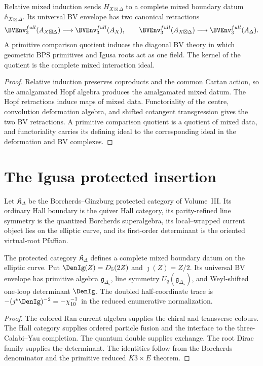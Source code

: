 \begin{theorem}
Relative mixed induction sends $H_{X\boxtimes\Delta}$ to a complete mixed boundary datum $\mathbb A_{X\boxtimes\Delta}$.  Its universal BV envelope has two canonical retractions
\[
 \BVEnv_3^{\mathrm{full}}(\mathbb A_{X\boxtimes\Delta})
 \longrightarrow
 \BVEnv_3^{\mathrm{full}}(\mathbb A_X),
 \qquad
 \BVEnv_3^{\mathrm{full}}(\mathbb A_{X\boxtimes\Delta})
 \longrightarrow
 \BVEnv_3^{\mathrm{full}}(\mathbb A_\Delta).
\]
A primitive comparison quotient induces the diagonal BV theory in which geometric BPS primitives and Igusa roots act as one field.  The kernel of the quotient is the complete mixed interaction ideal.
\end{theorem}
\begin{proof}
Relative induction preserves coproducts and the common Cartan action, so the amalgamated Hopf algebra produces the amalgamated mixed datum.  The Hopf retractions induce maps of mixed data.  Functoriality of the centre, convolution deformation algebra, and shifted cotangent transgression gives the two BV retractions.  A primitive comparison quotient is a quotient of mixed data, and functoriality carries its defining ideal to the corresponding ideal in the deformation and BV complexes.
\end{proof}

\chapter{The Igusa protected insertion}
Let $\mathfrak K_\Delta$ be the Borcherds--Ginzburg protected category of Volume~III.  Its ordinary Hall boundary is the quiver Hall category, its parity-refined line symmetry is the quantized Borcherds superalgebra, its local--wrapped current object lies on the elliptic curve, and its first-order determinant is the oriented virtual-root Pfaffian.

\begin{theorem}
The protected category $\mathfrak K_\Delta$ defines a complete mixed boundary datum on the elliptic curve.  Put $\DenIg(Z)=D_5(2Z)$ and $\jmath(Z)=Z/2$.  Its universal BV envelope has primitive algebra $\mathfrak g_{\Delta_5}$, line symmetry $U_q(\mathfrak g_{\Delta_5})$, and Weyl-shifted one-loop determinant $\DenIg$.  The doubled half-coordinate trace is $-(\jmath^*\DenIg)^{-2}=-\chi_{10}^{-1}$ in the reduced enumerative normalization.
\end{theorem}
\begin{proof}
The colored Ran current algebra supplies the chiral and transverse colours.  The Hall category supplies ordered particle fusion and the interface to the three-Calabi--Yau completion.  The quantum double supplies exchange.  The root Dirac family supplies the determinant.  The identities follow from the Borcherds denominator and the primitive reduced $K3\times E$ theorem.
\end{proof}

